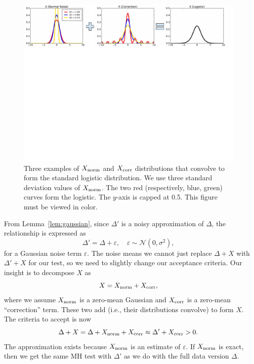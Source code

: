 \documentclass{article}
\begin{document}
\begin{figure}[t]
    \centering
    \includegraphics[width=1\textwidth]{mh_convolution_diagram_v2}
    \caption{
    Three examples of $X_{\rm norm}$ and $X_{\rm corr}$ distributions that convolve to form the
    standard logistic distribution. We use three standard deviation values of $X_{\rm norm}$. The
    two red (respectively, blue, green) curves form the logistic. The $y$-axis is capped at 0.5.
    This figure must be viewed in color.
    }
    \label{fig:deconvolution}
\end{figure}

From Lemma~\ref{lem:gaussian}, since $\Delta'$ is a noisy approximation of $\Delta$, the
relationship is expressed as
\begin{equation}\label{eq:relationship}
\Delta' = \Delta + \varepsilon, \quad \varepsilon \sim \mathcal{N}(0, \sigma^2),
\end{equation}
for a Gaussian noise term $\varepsilon$.  The noise means we cannot just replace $\Delta+X$ with
$\Delta'+X$ for our test, so we need to slightly change our acceptance criteria. Our insight is to
decompose $X$ as
\begin{equation}\label{eq:deconvolution}
X = X_{\rm norm}+X_{\rm corr},
\end{equation}
where we assume $X_{\rm norm}$ is a zero-mean Gaussian and $X_{\rm corr}$ is a zero-mean
``correction'' term.  These two add (i.e., their distributions convolve) to form $X$. The criteria
to accept is now
\begin{equation}\label{eq:criteria}
\Delta + X = \Delta + X_{\rm norm} + X_{\rm corr} \approx \Delta' + X_{\rm corr} >0.
\end{equation}
The approximation exists because $X_{\rm norm}$ is an estimate of $\varepsilon$. If $X_{\rm norm}$
is exact, then we get the same MH test with $\Delta'$ as we do with the full data version $\Delta$.
\end{document}
